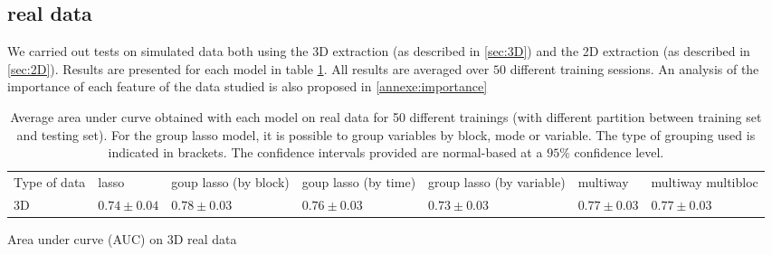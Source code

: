 \documentclass[preprint,12pt]{elsarticle}
\begin{document}
\subsection{real data}
\noindent We carried out tests on simulated data both using the 3D extraction (as described in \ref{sec:3D}) and the 2D extraction (as described in \ref{sec:2D}). Results are presented for each model in table \ref{tab:result_real}. All results are averaged over $50$ different training sessions. An analysis of the importance of each feature of the data studied is also proposed in \ref{annexe:importance}\\
\begin{table}[tbp]
    \centering
    \caption{Average area under curve obtained with each model on real data for 50 different trainings (with different partition between training set and testing set). For the group lasso model, it is possible to group variables by block, mode or variable. The type of grouping used is indicated in brackets. The confidence intervals provided are normal-based at a $95\%$ confidence level.}
    \label{tab:result_real}
    \renewcommand{\arraystretch}{1.2} 
    \begin{adjustbox}{center}
    \begin{tabular}{|>{\centering\arraybackslash}m{2cm}|>{\centering\arraybackslash}m{2.5cm}|>{\centering\arraybackslash}m{2.5cm}|>{\centering\arraybackslash}m{2.5cm}|>{\centering\arraybackslash}m{2.5cm}|>{\centering\arraybackslash}m{2cm}|>{\centering\arraybackslash}m{2.5cm}|}
        \cline{1-7}
        Type of data & lasso & goup lasso (by block) & goup lasso (by time)& group lasso (by variable) & multiway & multiway multibloc\\
        \cline{1-7} 
        3D & $0.74 \pm 0.04$& $0.78 \pm 0.03$ & $0.76 \pm 0.03$ & $0.73 \pm 0.03$ & $0.77 \pm 0.03$ & $0.77 \pm 0.03$ \\
        \cline{1-7}

    \end{tabular}
    
\end{adjustbox}
\parbox{0.9\textwidth}{
\vspace{0.2 cm}    
\centering \small Area under curve (AUC) on 3D real data}
\vspace{0.3 cm}


\end{table}
\end{document}
